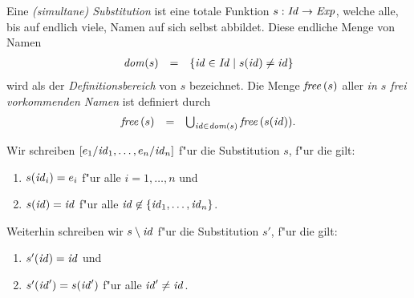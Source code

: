 \documentclass[12pt,fleqn,a4paper]{article}
\begin{document}
\begin{definition}
  Eine \emph{(simultane) Substitution} ist eine totale Funktion $s: {\text{\it Id\/}} \to {\text{\it Exp\/}}$, welche alle, bis auf endlich
  viele, Namen auf sich selbst abbildet. Diese endliche Menge von Namen
  \[\begin{array}{rcl}
    {\text{\it dom\/}}(s) &=& \{{\text{\it id\/}}\in{\text{\it Id\/}} \mid s({\text{\it id\/}}) \ne {\text{\it id\/}}\}
  \end{array}\]
  wird als der \emph{Definitionsbereich} von $s$ bezeichnet. Die Menge ${\text{\it free\/}}\,(s)$ aller
  \emph{in $s$ frei vorkommenden Namen} ist definiert durch
  \[\begin{array}{rcl}
    {\text{\it free\/}}\,(s) &=& \bigcup_{{\text{\it id\/}}\in{\text{\it dom\/}}(s)}{\text{\it free\/}}\,(s({\text{\it id\/}})).
  \end{array}\]
\end{definition}

\noindent
Wir schreiben $[e_1/{\text{\it id\/}}_1,\ldots,e_n/{\text{\it id\/}}_n]$ f"ur die Substitution $s$, f"ur die gilt:
\begin{enumerate}
\item $s({\text{\it id\/}}_i) = e_i$ f"ur alle $i = 1,\ldots,n$ und
\item $s({\text{\it id\/}}) = {\text{\it id\/}}$ f"ur alle ${\text{\it id\/}} \not \in \{{\text{\it id\/}}_1,\ldots,{\text{\it id\/}}_n\}$.
\end{enumerate}
Weiterhin schreiben wir $s \setminus {\text{\it id\/}}$ f"ur die Substitution $s'$, f"ur die gilt:
\begin{enumerate}
\item $s'({\text{\it id\/}}) = {\text{\it id\/}}$ und
\item $s'({\text{\it id\/}}') = s({\text{\it id\/}}')$ f"ur alle ${\text{\it id\/}}' \ne {\text{\it id\/}}$.
\end{enumerate}
\end{document}

